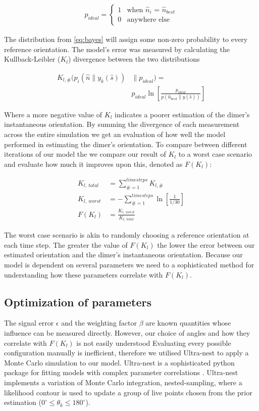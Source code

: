 \documentclass[final, 3p]{elsarticle}
\begin{document}
\begin{align}
	p_{ideal} = 
	\begin{cases}
		1 & \text{when $\hat{n}_i$ = $\hat{n}_{best}$}\\
		0 & \text{anywhere else}
	\end{cases}
\end{align}

The distribution from \eqref{eq:bayes} will assign some non-zero probability to every reference orientation. The model's error was measured by calculating the Kullback-Leibler ($K_l$) divergence between the two distributions 

\begin{align}
	K_{l, \#}(p_i(\hat{n}\parallel y_k(\hat{s})) &\parallel p_{ideal}) =\nonumber \\
	&p_{ideal}\ln \left[\frac{p_{ideal}}{p(\hat{n}_{best}\parallel y(\hat{s}))}
	\right]
\end{align}

Where a more negative value of $K_l$ indicates a poorer estimation of the dimer's instantaneous orientation. By summing the divergence of each measurement across the entire simulation we get an evaluation of how well the model performed in estimating the dimer's orientation. To compare between different iterations of our model the we compare our result of $K_l$ to a worst case scenario and evaluate how much it improves upon this, denoted as $F(K_l)$:

\begin{align}
	K_{l, \ total} &= \sum\limits_{\# =1}^{timesteps} K_{l,\#} \\
	K_{l, \ worst} &= -\sum\limits_{\#=1}^{timesteps} \ln \left[\frac{1}{1/30} \right] \\
	F(K_l) &= \frac{K_{l,\ worst}}{K_{l, \ total}}
\end{align}

The worst case scenario is akin to randomly choosing a reference orientation at each time step. The greater the value of $F(K_l)$ the lower the error between our estimated orientation and the dimer's instantaneous orientation. Because our model is dependent on several parameters we need to a sophisticated method for understanding how these parameters correlate with $F(K_l)$.

\subsection{Optimization of parameters}
\label{sec:2.4}
The signal error $\epsilon$ and the weighting factor $\beta$ are known quantities whose influence can be measured directly. However, our choice of angles and how they correlate with $F(K_l)$ is not easily understood Evaluating every possible configuration manually is inefficient, therefore we utilised Ultra-nest to apply a Monte Carlo simulation to our model. Ultra-nest is a sophisticated python package for fitting models with complex parameter correlations \cite{Buchner2016Ultranest}. Ultra-nest implements a variation of Monte Carlo integration, nested-sampling, where a likelihood contour is used to update a group of live points chosen from the prior estimation ($0^{\circ} \leq \theta_k \leq 180^{\circ}$).
\end{document}

